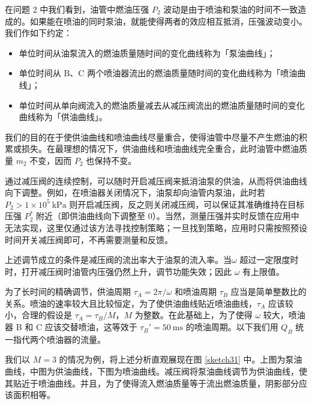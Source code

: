 \documentclass[withoutpreface,bwprint]{cumcmthesis}
\newcommand{\prb}{\times 10^5~\mathrm{kPa}}
\newcommand{\tim}{~\mathrm{ms}}
\begin{document}
在问题 2 中我们看到，油管中燃油压强 $P_2$ 波动是由于喷油和泵油的时间不一致造成的。如果能在喷油的同时泵油，就能使得两者的效应相互抵消，压强波动变小。我们作如下约定：

\begin{itemize}
	\item 单位时间从油泵流入的燃油质量随时间的变化曲线称为「泵油曲线」；
	\item 单位时间从 B、C 两个喷油器流出的燃油质量随时间的变化曲线称为「喷油曲线」；
	\item 单位时间从单向阀流入的燃油质量减去从减压阀流出的燃油质量随时间的变化曲线称为「供油曲线」。
\end{itemize}

我们的目的在于使供油曲线和喷油曲线尽量重合，使得油管中尽量不产生燃油的积累或损失。在最理想的情况下，供油曲线和喷油曲线完全重合，此时油管中燃油质量 $m_2$ 不变，因而 $P_2$ 也保持不变。

通过减压阀的连续控制，可以随时开启减压阀来抵消油泵的供油，从而将供油曲线向下调整。例如，在喷油器关闭情况下，油泵却向油管内泵油，此时若 $P_2>1\prb$ 则开启减压阀，反之则关闭减压阀，可以保证其准确维持在目标压强 $P_2^*$ 附近（即供油曲线向下调整至 $0$）。当然，测量压强并实时反馈在应用中无法实现，这里仅通过该方法寻找控制策略；一旦找到策略，应用时只需按照预设时间开关减压阀即可，不再需要测量和反馈。

上述调节成立的条件是减压阀的流出率大于油泵的流入率。当$\omega$ 超过一定限度时时，打开减压阀时油管内压强仍然上升，调节功能失效；因此 $\omega$ 有上限值。

为了长时间的精确调节，供油周期 $\tau_A=2\pi/\omega$ 和喷油周期 $\tau_B$ 应当是简单整数比的关系。喷油的速率较大且比较恒定，为了使供油曲线贴近喷油曲线，$\tau_A$ 应该较小，合理的假设是 $\tau_A=\tau_B/M$，$M$ 为整数。在此基础上，为了使得 $\omega$ 较大，喷油器 B 和 C 应该交替喷油，这等效于 $\tau_B'=50\tim$ 的喷油周期。以下我们用 $Q_B$ 统一指代两个喷油器的流量。

我们以 $M=3$ 的情况为例，将上述分析直观展现在图 \ref{sketch31} 中。上图为泵油曲线，中图为供油曲线，下图为喷油曲线。减压阀将泵油曲线调节为供油曲线，使其贴近于喷油曲线。并且，为了使得流入燃油质量等于流出燃油质量，阴影部分应该面积相等。
\end{document}
